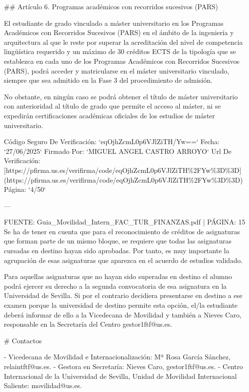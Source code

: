 \documentclass{article}
\begin{document}
\begin{itemize}
\begin{itemize}
\begin{scriptsize}
                  \#\# Artículo 6. Programas académicos con recorridos sucesivos (PARS)

                  El estudiante de grado vinculado a máster universitario en los Programas Académicos con Recorridos Sucesivos (PARS) en el ámbito de la ingeniería y arquitectura al que le reste por superar la acreditación del nivel de competencia lingüística requerido y un máximo de 30 créditos ECTS de la tipología que se establezca en cada uno de los Programas Académicos con Recorridos Sucesivos (PARS), podrá acceder y matricularse en el máster universitario vinculado, siempre que sea admitido en la Fase 3 del procedimiento de admisión.

                  No obstante, en ningún caso se podrá obtener el título de máster universitario con anterioridad al título de grado que permite el acceso al máster, ni se expedirán certificaciones académicas oficiales de los estudios de máster universitario.

                  Código Seguro De Verificación: `eqOjhZcmL0p6VJlZiTH/Yw==`
                  Fecha: `27/06/2025`
                  Firmado Por: `MIGUEL ANGEL CASTRO ARROYO`
                  Url De Verificación: [https://pfirma.us.es/verifirma/code/eqOjhZcmL0p6VJlZiTH\%2FYw\%3D\%3D](https://pfirma.us.es/verifirma/code/eqOjhZcmL0p6VJlZiTH\%2FYw\%3D\%3D)
                  Página: `4/50`

                  ---

                  FUENTE: Guia\_Movilidad\_Intern\_FAC\_TUR\_FINANZAS.pdf | PÁGINA: 15
                  Se ha de tener en cuenta que para el reconocimiento de créditos de asignaturas que forman parte de un mismo bloque, se requiere que todas las asignaturas cursadas en destino hayan sido aprobadas. Por tanto, es muy importante la agrupación de esas asignaturas que aparezca en el acuerdo de estudios validado.

                  Para aquellas asignaturas que no hayan sido superadas en destino el alumno podrá ejercer su derecho a la segunda convocatoria de esa asignatura en la Universidad de Sevilla. Si por el contrario decidiera presentarse en destino a ese examen porque la universidad de destino permite esta opción, el/la estudiante deberá informar de ello a la Vicedecana de Movilidad y también a Nieves Caro, responsable en la Secretaría del Centro gestor1ftf@us.es.

                  \# Contactos

                  - Vicedecana de Movilidad e Internacionalización: Mª Rosa García Sánchez, relaintftf@us.es.
                  - Gestora en Secretaría: Nieves Caro, gestor1ftf@us.es.
                  - Centro Internacional de la Universidad de Sevilla, Unidad de Movilidad Internacional Saliente: movilidad@us.es.


\end{scriptsize}
\end{itemize}
\end{itemize}
\end{document}

